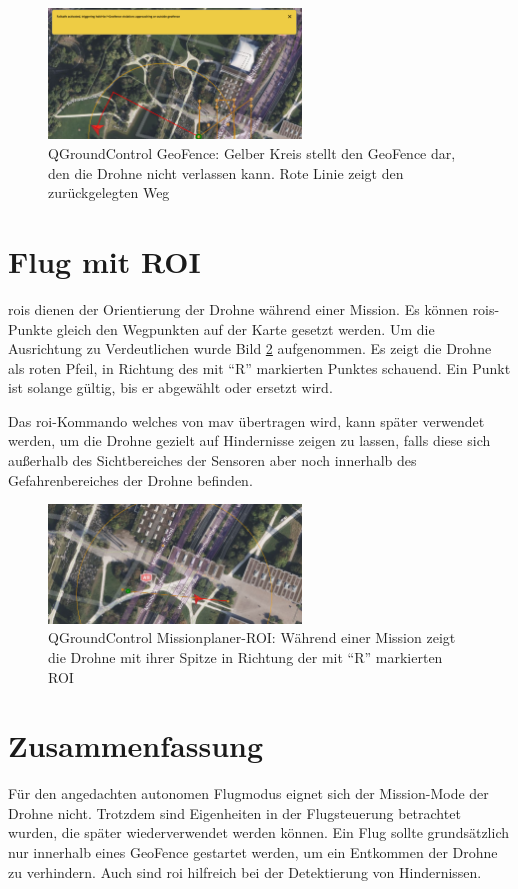 \begin{figure}[h]
    \centering
    \includegraphics[width=0.6\textwidth]{images/mission_geofence.png}
    \caption[QGroundControl GeoFence]{QGroundControl GeoFence: Gelber Kreis stellt den GeoFence dar, den die Drohne nicht verlassen kann. Rote Linie zeigt den zurückgelegten Weg}
    \label{fig:qgc_mission_geofence}
\end{figure}

\section{Flug mit ROI}
\glspl{roi} dienen der Orientierung der Drohne während einer Mission. Es können \glspl{roi}-Punkte gleich den Wegpunkten auf der Karte gesetzt werden. Um die Ausrichtung zu Verdeutlichen wurde Bild \ref{fig:qgc_mission_roi} aufgenommen. Es zeigt die Drohne als roten Pfeil, in Richtung des mit \enquote{R} markierten Punktes schauend. Ein Punkt ist solange gültig, bis er abgewählt oder ersetzt wird.

Das \gls{roi}-Kommando welches von \acrshort{mav} übertragen wird, kann später verwendet werden, um die Drohne gezielt auf Hindernisse zeigen zu lassen, falls diese sich außerhalb des Sichtbereiches der Sensoren aber noch innerhalb des Gefahrenbereiches der Drohne befinden.

\begin{figure}[h]
    \centering
    \includegraphics[width=0.6\textwidth]{images/mission_roi.png}
    \caption[QGroundControl Missionplaner-ROI]{QGroundControl Missionplaner-ROI: Während einer Mission zeigt die Drohne mit ihrer Spitze in Richtung der mit \enquote{R} markierten ROI}
    \label{fig:qgc_mission_roi}
\end{figure}

\section{Zusammenfassung}
Für den angedachten autonomen Flugmodus eignet sich der Mission-Mode der Drohne nicht. Trotzdem sind Eigenheiten in der Flugsteuerung betrachtet wurden, die später wiederverwendet werden können. Ein Flug sollte grundsätzlich nur innerhalb eines GeoFence gestartet werden, um ein Entkommen der Drohne zu verhindern. Auch sind \acrshort{roi} hilfreich bei der Detektierung von Hindernissen. 
